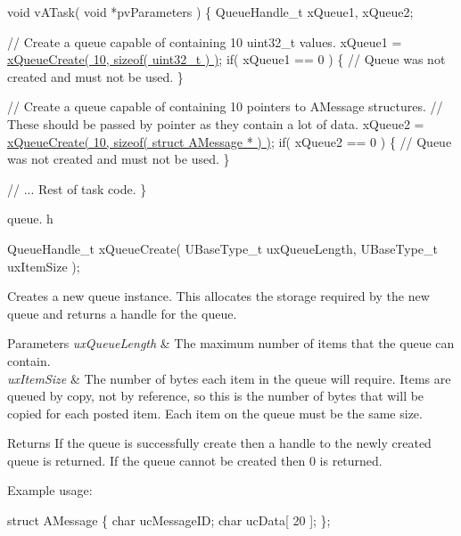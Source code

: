 \begin{DoxyPre}void vATask( void *pvParameters )
\{
QueueHandle\_t xQueue1, xQueue2;\end{DoxyPre}



\begin{DoxyPre} // Create a queue capable of containing 10 uint32\_t values.
 xQueue1 = \hyperlink{vendor_2ceedling_2plugins_2freertos_2src_2freertos_2include_2queue_8h_aeb858b824bd74a934ea7ebb81af2a6bb}{xQueueCreate( 10, sizeof( uint32\_t ) )};
 if( xQueue1 == 0 )
 \{
     // Queue was not created and must not be used.
 \}\end{DoxyPre}



\begin{DoxyPre} // Create a queue capable of containing 10 pointers to AMessage structures.
 // These should be passed by pointer as they contain a lot of data.
 xQueue2 = \hyperlink{vendor_2ceedling_2plugins_2freertos_2src_2freertos_2include_2queue_8h_aeb858b824bd74a934ea7ebb81af2a6bb}{xQueueCreate( 10, sizeof( struct AMessage * ) )};
 if( xQueue2 == 0 )
 \{
     // Queue was not created and must not be used.
 \}\end{DoxyPre}



\begin{DoxyPre} // ... Rest of task code.
\}
\end{DoxyPre}


queue. h 
\begin{DoxyPre}
QueueHandle\_t xQueueCreate(
                          UBaseType\_t uxQueueLength,
                          UBaseType\_t uxItemSize
                      );
  \end{DoxyPre}


Creates a new queue instance. This allocates the storage required by the new queue and returns a handle for the queue.


\begin{DoxyParams}{Parameters}
{\em ux\+Queue\+Length} & The maximum number of items that the queue can contain.\\
\hline
{\em ux\+Item\+Size} & The number of bytes each item in the queue will require. Items are queued by copy, not by reference, so this is the number of bytes that will be copied for each posted item. Each item on the queue must be the same size.\\
\hline
\end{DoxyParams}
\begin{DoxyReturn}{Returns}
If the queue is successfully create then a handle to the newly created queue is returned. If the queue cannot be created then 0 is returned.
\end{DoxyReturn}
Example usage\+: 
\begin{DoxyPre}
struct AMessage
\{
   char ucMessageID;
   char ucData[ 20 ];
\};\end{DoxyPre}



